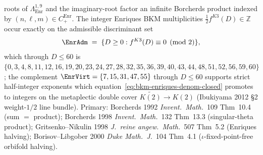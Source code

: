 \begin{theorem}
roots of $\Lambda^{1,9}_{\mathrm{Enr}}$ and the imaginary-root
factor an infinite Borcherds product indexed by
$(n,\ell,m)\in C_+^{\mathrm{Enr}}$. The integer Enriques BKM
multiplicities $\tfrac{1}{2}f^{K3}(D)\in\mathbb{Z}$ occur exactly on
the admissible discriminant set
\begin{equation}
\label{eq:bkm-enriques-denom-admissible}
 \EnrAdm \;=\; \{D\geq 0 : f^{K3}(D)\equiv 0\pmod 2\},
\end{equation}
which through $D\leq 60$ is
$\{0, 3, 4, 8, 11, 12, 16, 19, 20, 23, 24, 27, 28, 32, 35, 36, 39,
40, 43, 44, 48, 51, 52, 56, 59, 60\}$; the complement
$\EnrVirt = \{7, 15, 31, 47, 55\}$ through $D\leq 60$ supports strict
half-integer exponents which equation~\eqref{eq:bkm-enriques-denom-closed}
promotes to integers on the metaplectic double cover
$\widetilde{K(2)}\to K(2)$
(Ibukiyama 2012 \S 2 weight-$1/2$ line bundle).
Primary:
Borcherds 1992 \emph{Invent.~Math.}~109 Thm~10.4 (sum $=$ product);
Borcherds 1998 \emph{Invent.~Math.}~132 Thm~13.3 (singular-theta
product);
Gritsenko--Nikulin 1998 \emph{J.~reine angew.~Math.}~507 Thm~5.2
(Enriques halving);
Borisov--Libgober 2000 \emph{Duke Math.~J.}~104 Thm~4.1
($\iota$-fixed-point-free orbifold halving).
\end{theorem}

